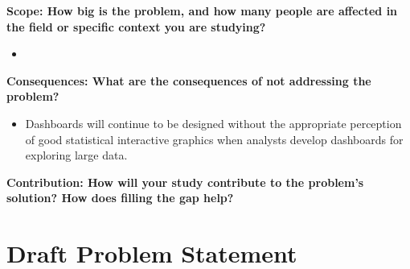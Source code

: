 \documentclass[print]{nuthesis}
\providecommand{\tightlist}{%
  \setlength{\itemsep}{0pt}\setlength{\parskip}{0pt}}
\begin{document}
\textbf{Scope: How big is the problem, and how many people are affected in the field or specific context you are studying?}

\begin{itemize}
\tightlist
\item
\end{itemize}

\textbf{Consequences: What are the consequences of not addressing the problem?}

\begin{itemize}
\tightlist
\item
  Dashboards will continue to be designed without the appropriate perception of good statistical interactive graphics when analysts develop dashboards for exploring large data.
\end{itemize}

\textbf{Contribution: How will your study contribute to the problem's solution? How does filling the gap help?}

\hypertarget{draft-problem-statement}{%
\chapter{Draft Problem Statement}\label{draft-problem-statement}}


\backmatter

% 






\end{document}
